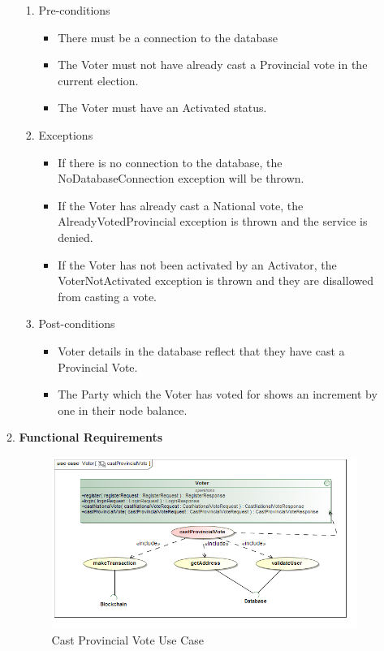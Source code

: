 \begin{enumerate}
\begin{enumerate}
		\begin{enumerate}
			\item Pre-conditions
			\begin{itemize}
				\item There must be a connection to the database
				\item The Voter must not have already cast a Provincial vote in the current election. 
				\item The Voter must have an Activated status.  
			\end{itemize}
			
			\item Exceptions
			\begin{itemize}
				\item If there is no connection to the database, the NoDatabaseConnection exception will be thrown.
				\item If the Voter has already cast a National vote, the AlreadyVotedProvincial exception is thrown and the service is denied.
				\item If the Voter has not been activated by an Activator, the VoterNotActivated exception is thrown and they are disallowed from casting a vote. 
			\end{itemize}
			
			\item Post-conditions
			\begin{itemize}
				\item Voter details in the database reflect that they have cast a Provincial Vote. 
				\item The Party which the Voter has voted for shows an increment by one in their node balance. 
			\end{itemize}
		\end{enumerate}
		
		\item \textbf{Functional Requirements}
		\begin{figure}[H]
			\centering
			\includegraphics[width=0.75\linewidth]{../Images/Voter/UseCases/castProvincialVote_useCase.png}
			\caption{Cast Provincial Vote Use Case}
		\end{figure}
		

\end{enumerate}
\end{enumerate}
